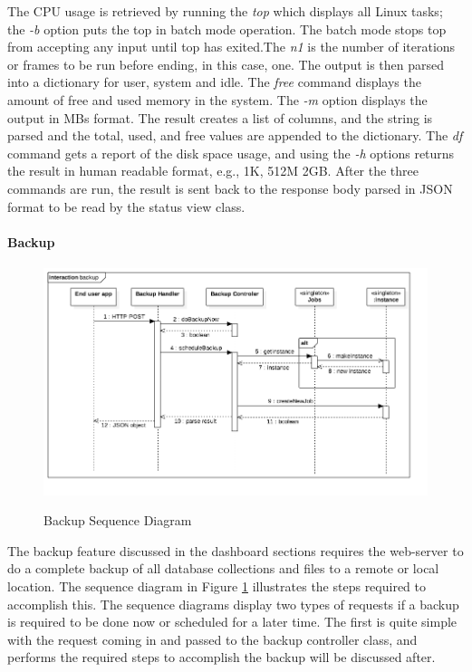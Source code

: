 The CPU usage is retrieved by running the \textit{top} which displays all Linux tasks; the \textit{-b} option puts the top in batch mode operation. The batch mode stops top from accepting any input until top has exited.The \textit{n1} is the number of iterations or frames to be run before ending, in this case, one. The output is then parsed into a dictionary for user, system and idle. 
The \textit{free} command displays the amount of free and used memory in the system. The \textit{-m} option displays the output in MBs format. The result creates a list of columns, and the string is parsed and the total, used, and free values are appended to the dictionary. 
The \textit{df} command gets a report of the disk space usage, and using the \textit{-h} options returns the result in human readable format, e.g., 1K, 512M 2GB. After the three commands are run, the result is sent back to the response body parsed in JSON format to be read by the status view class.

\paragraph{Backup}

\begin{figure}[!h]
    \caption{Backup Sequence Diagram}
    \centering
    \includegraphics[width=150mm]{images/sequence/backup}
    \label{fig:backup-s}
\end{figure}

The backup feature discussed in the dashboard sections requires the web-server to do a complete backup of all database collections and files to a remote or local location. The sequence diagram in Figure \ref{fig:backup-s} illustrates the steps required to accomplish this. The sequence diagrams display two types of requests if a backup is required to be done now or scheduled for a later time. The first is quite simple with the request coming in and passed to the backup controller class, and performs the required steps to accomplish the backup will be discussed after.

